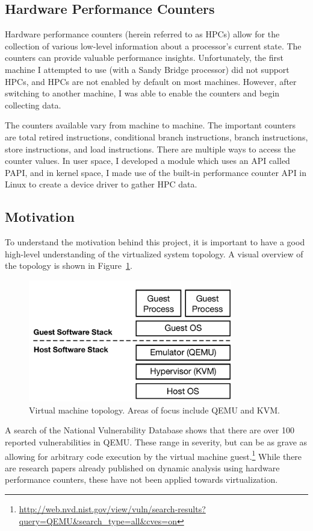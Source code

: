 \documentclass[notitlepage]{article}
\begin{document}
\subsection{Hardware Performance Counters}
Hardware performance counters (herein referred to as HPCs) allow for the
collection of various low-level information about a processor's current state.
The counters can provide valuable performance insights. Unfortunately, the first
machine I attempted to use (with a Sandy Bridge processor) did not support HPCs,
and HPCs are not enabled by default on most machines.  However, after switching
to another machine, I was able to enable the counters and begin collecting data.

The counters available vary from machine to machine. The important counters are
total retired instructions, conditional branch instructions, branch
instructions, store instructions, and load instructions.  There are multiple
ways to access the counter values. In user space, I developed a module which
uses an API called PAPI\cite{papi}, and in kernel space, I made use of the
built-in performance counter API in Linux to create a device driver to gather
HPC data.

\subsection{Motivation}
To understand the motivation behind this project, it is important to have a good
high-level understanding of the virtualized system topology. A visual overview
of the topology is shown in Figure~\ref{fig:vmtop}.

\begin{figure}[htp]
    \centering
    \includegraphics[width=3.5in]{topology.pdf}
    \caption{Virtual machine topology. Areas of focus include QEMU and KVM.}
    \label{fig:vmtop}
\end{figure}

A search of the National Vulnerability Database shows that there are over
100 reported vulnerabilities in QEMU. These range in severity, but can be as grave
as allowing for arbitrary code execution by the virtual machine
guest.\footnote{\url{http://web.nvd.nist.gov/view/vuln/search-results?query=QEMU&search_type=all&cves=on}}
While there are research papers already published on dynamic analysis using
hardware performance counters, these have not been applied towards
virtualization\cite{numchecker}\cite{feasibility}\cite{pc}.
\end{document}
